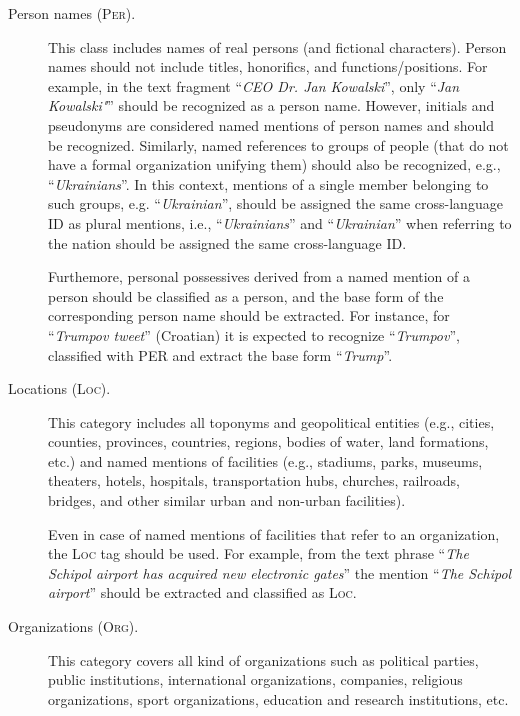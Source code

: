\documentclass[11pt]{article}
\begin{document}
\begin{description}

\item[Person names (\textsc{Per}).] {This class includes names of
    real persons (and fictional characters).} Person names should not
  include titles, honorifics, and functions/positions. For example, in
  the text fragment ``\textit{CEO Dr. Jan Kowalski}'', only ``\textit{Jan
    Kowalski"}'' should be recognized as a person name. However, initials
  and pseudonyms are considered named mentions of person names and should
  be recognized.  Similarly, named references to groups of people (that
  do not have a formal organization unifying them) should also be
  recognized, e.g., ``\textit{Ukrainians}''. In this context, mentions of
  a single member belonging to such groups, e.g.  ``\textit{Ukrainian}'',
  should be assigned the same cross-language ID as plural mentions, i.e.,
  ``\textit{Ukrainians}'' and ``\textit{Ukrainian}'' when referring to
  the nation should be assigned the same cross-language ID.

  Furthemore, personal possessives derived from a named mention of a person should
  be classified as a person, and the base form of the corresponding
  person name should be extracted. For instance, for
  ``\textit{Trumpov tweet}'' (Croatian) it is expected to recognize
  ``\textit{Trumpov}'', classified with PER and extract the base
  form ``\textit{Trump}''.


\item[Locations (\textsc{Loc}).]

This category includes all toponyms and geopolitical entities (e.g., cities,
counties, provinces, countries, regions, bodies of water, land formations,
etc.) and named mentions of facilities (e.g., stadiums, parks, museums,
theaters, hotels, hospitals, transportation hubs, churches, railroads, bridges,
and other similar urban and non-urban facilities).

Even in case of named mentions of facilities that refer to an organization, the
\textsc{Loc} tag should be used. For example, from the text phrase
``\textit{The Schipol airport has acquired new electronic gates}'' the mention
``\textit{The Schipol airport}'' should be extracted and classified as
\textsc{Loc}.

\item[Organizations (\textsc{Org}).]

This category covers all kind of organizations such as political parties,
public institutions, international organizations, companies, religious
organizations, sport organizations, education and research institutions, etc.


\end{description}
\end{document}
